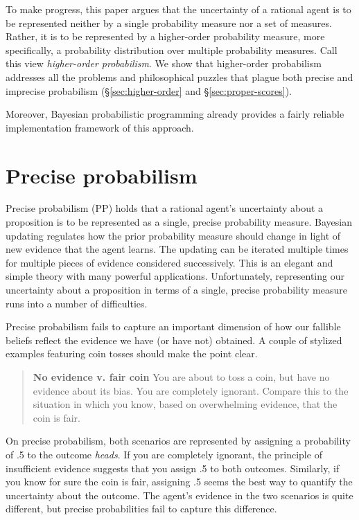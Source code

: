 \documentclass[
  letterpaper,
  DIV=11,
  numbers=noendperiod]{scrartcl}
\begin{document}
To make progress, this paper argues that the uncertainty of a rational
agent is to be represented neither by a single probability measure nor a
set of measures. Rather, it is to be represented by a higher-order
probability measure, more specifically, a probability distribution over
multiple probability measures. Call this view \emph{higher-order
probabilism}. We show that higher-order probabilism addresses all the
problems and philosophical puzzles that plague both precise and
imprecise probabilism (\S \ref{sec:higher-order} and
\S \ref{sec:proper-scores}).

Moreover, Bayesian probabilistic programming already provides a fairly
reliable implementation framework of this approach.



\hypertarget{precise-probabilism}{%
\section{Precise probabilism}\label{precise-probabilism}}

\label{sec:precise-probabilism}

Precise probabilism (\textsf{PP}) holds that a rational agent's
uncertainty about a proposition is to be represented as a single,
precise probability measure. Bayesian updating regulates how the prior
probability measure should change in light of new evidence that the
agent learns. The updating can be iterated multiple times for multiple
pieces of evidence considered successively. This is an elegant and
simple theory with many powerful applications. Unfortunately,
representing our uncertainty about a proposition in terms of a single,
precise probability measure runs into a number of difficulties.

Precise probabilism fails to capture an important dimension of how our
fallible beliefs reflect the evidence we have (or have not) obtained. A
couple of stylized examples featuring coin tosses should make the point
clear.

\begin{quote}
\textbf{No evidence v. fair coin}
You are about to toss a coin, but have no evidence 
about its bias. You are completely ignorant. 
Compare this to the situation in which you know, 
based on overwhelming evidence, that the coin is fair. 
\end{quote}

\noindent On precise probabilism, both scenarios are represented by
assigning a probability of .5 to the outcome \emph{heads}. If you are
completely ignorant, the principle of insufficient evidence suggests
that you assign .5 to both outcomes. Similarly, if you know for sure the
coin is fair, assigning .5 seems the best way to quantify the
uncertainty about the outcome. The agent's evidence in the two scenarios
is quite different, but precise probabilities fail to capture this
difference.
\end{document}

